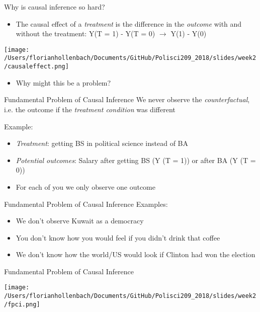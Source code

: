 \documentclass[presentation]{beamer}
\begin{document}
\begin{frame}[label={sec:orgbcb89c1}]{Why is causal inference so hard?}
\begin{itemize}
\item The causal effect of a \emph{treatment} is the difference in the \emph{outcome} with and without the treatment:
Y(T = 1) - Y(T = 0) \(\rightarrow\) Y(1) - Y(0)
\end{itemize}

\pause
\begin{center}
\texttt{[image: /Users/florianhollenbach/Documents/GitHub/Polisci209\_2018/slides/week2/causaleffect.png]}
\end{center}

\begin{itemize}
\item Why might this be a problem?
\end{itemize}
\end{frame}

\begin{frame}[label={sec:org6027227}]{Fundamental Problem of Causal Inference}
We never observe the \emph{counterfactual}, i.e. the outcome if the \emph{treatment condition} was different

\pause
Example:
\begin{itemize}
\item \emph{Treatment}: getting BS in political science instead of BA
\item \emph{Potential outcomes}: Salary after getting BS (Y (T = 1)) or after BA (Y (T = 0))
\item For each of you we only observe one outcome
\end{itemize}
\end{frame}


\begin{frame}[label={sec:org4d08daa}]{Fundamental Problem of Causal Inference}
Examples:

\begin{itemize}
\item We don't observe Kuwait as a democracy
\item You don't know how you would feel if you didn't drink that coffee
\item We don't know how the world/US would look if Clinton had won the election
\end{itemize}
\end{frame}



\begin{frame}[label={sec:org159ce1b}]{Fundamental Problem of Causal Inference}
\begin{center}
\texttt{[image: /Users/florianhollenbach/Documents/GitHub/Polisci209\_2018/slides/week2/fpci.png]}
\end{center}
\end{frame}
\end{document}

